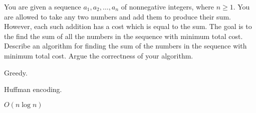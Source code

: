 \newpage
{} %

\problemdes

You are given a sequence $a_1, a_2, \dots, a_n$ of nonnegative integers, where $n \geq 1$. You are allowed to take any two numbers and add them to produce their sum. However, each such addition has a cost which is equal to the sum. The goal is to the find the sum of all the numbers in the sequence with minimum total cost. Describe an algorithm for finding the sum of the numbers in the sequence with minimum total cost. Argue the correctness of your algorithm.

\solution


Greedy.

Huffman encoding.









$O(n\log n)$



